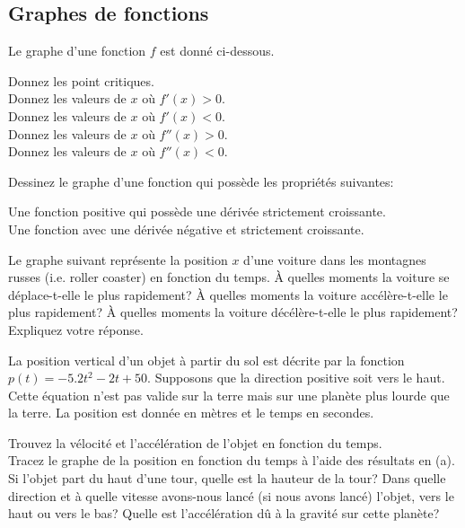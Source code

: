\subsection{Graphes de fonctions}

\begin{question}
Le graphe d'une fonction $f$ est donné ci-dessous.

 Donnez les point critiques.\\
 Donnez les valeurs de $x$ où $f'(x)>0$.\\
 Donnez les valeurs de $x$ où $f'(x)<0$.\\
 Donnez les valeurs de $x$ où $f''(x)>0$.\\
 Donnez les valeurs de $x$ où $f''(x)<0$.
\label{6Q5}
\end{question}

\begin{question}
Dessinez le graphe d'une fonction qui possède les propriétés suivantes:

 Une fonction positive qui possède une dérivée strictement
croissante.\\
 Une fonction avec une dérivée négative et strictement croissante.
\label{6Q6}
\end{question}

\begin{question}
Le graphe suivant représente la position $x$ d'une voiture dans les montagnes
russes (i.e. \lgm roller coaster\rgm) en fonction du temps.  À quelles
moments la voiture se déplace-t-elle le plus rapidement?  À quelles moments
la voiture accélère-t-elle le plus rapidement?  À quelles moments la voiture
décélère-t-elle le plus rapidement?  Expliquez votre réponse.
\label{6Q7}
\end{question}

\begin{question}
La position vertical d'un objet à partir du sol est décrite par la
fonction $p(t) = -5.2 t^2 - 2 t + 50$.  Supposons que la direction
positive soit vers le haut.  Cette équation n'est pas valide sur la
terre mais sur une planète plus lourde que la terre.  La position est
donnée en mètres et le temps en secondes.

 Trouvez la vélocité et l'accélération de l'objet en fonction
du temps.\\
 Tracez le graphe de la position en fonction du temps à l'aide
des résultats en (a).\\
 Si l'objet part du haut d'une tour, quelle est la hauteur de
la tour?  Dans quelle direction et à quelle vitesse avons-nous lancé (si
nous avons lancé) l'objet, vers le haut ou vers le bas?  Quelle est
l'accélération dû à la gravité sur cette planète?
\label{6Q8}
\end{question}

